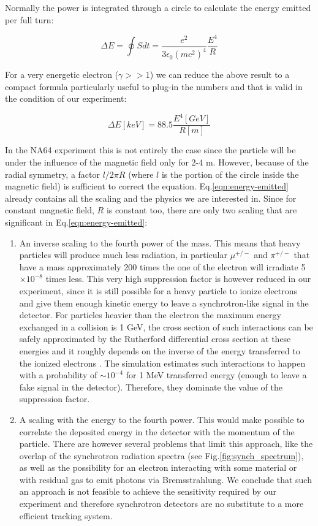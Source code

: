 Normally the power is integrated through a circle to calculate the energy emitted per full turn:

\begin{equation}
\Delta E = \oint S dt = \frac{e^2}{3\epsilon_0(mc^2)^4}\frac{E^4}{R}
\label{eqn:energy-emitted}
\end{equation}

For a very energetic electron ($\gamma >> 1$) we can reduce the above result to a compact formula particularly useful to plug-in the numbers and that is valid in the condition of our experiment:

\begin{equation}
\Delta E[keV] = 88.5\frac{E^4[GeV]}{R[m]}
\label{eqn:energy-emitted-simp}
\end{equation}

In the NA64 experiment this is not entirely the case since the particle will be under the influence of the magnetic field only for 2-4 \si{\meter}. However, because of the radial symmetry, a factor $l/2\pi R$ (where $l$ is the portion of the circle inside the magnetic field) is sufficient to correct the equation. Eq.\ref{eqn:energy-emitted} already contains all the scaling and the physics we are interested in.
 Since for constant magnetic field, $R$ is constant too, there are only two scaling that are significant in Eq.\ref{eqn:energy-emitted}:
 \begin{enumerate}
 \item An inverse scaling to the fourth power of the mass. This means that heavy particles will produce much less radiation, in particular $\mu^{+/-}$ and $\pi^{+/-}$ that have a mass approximately 200 times the one of the electron will irradiate 5$\times 10^{-8}$ times less. This very high suppression factor is however reduced in our experiment, since it is still possible for a heavy particle to ionize electrons and give them enough kinetic energy to leave a synchrotron-like signal in the detector. For particles heavier than the electron the maximum energy exchanged in a collision is 1 GeV, the cross section of such interactions can be safely approximated by the Rutherford differential cross section at these energies and it roughly depends on the inverse of the energy transferred to the ionized electrons \cite{review-particle-physics}. The simulation estimates such interactions to happen with a probability of $\sim 10^{-4}$ for 1 MeV transferred energy (enough to leave a fake signal in the detector). Therefore, they dominate the value of the suppression factor.
 \item A scaling with the energy to the fourth power. This would make possible to correlate the deposited energy in the detector with the momentum of the particle. There are however several problems that limit this approach, like the overlap of the synchrotron radiation spectra (see Fig.\ref{fig:synch_spectrum}), as well as the possibility for an electron interacting with some material or with residual gas to emit photons via Bremsstrahlung. We conclude that such an approach is not feasible to achieve the sensitivity required by our experiment and therefore synchrotron detectors are no substitute to a more efficient tracking system.
 \end{enumerate}
 
